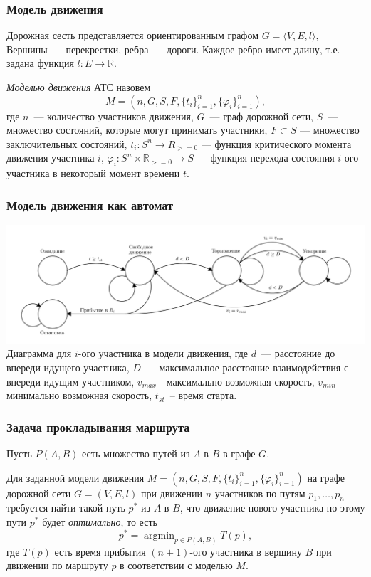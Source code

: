 \documentclass{beamer}
\DeclareMathOperator*{\argmin}{argmin}
\begin{document}
\begin{frame}\frametitle{Модель движения}
Дорожная сесть представляется ориентированным графом $ G = \langle V, E, l\rangle$, Вершины~--- перекрестки, ребра~--- дороги. Каждое ребро имеет длину, т.е. задана функция $l : E \rightarrow \mathbb {R} $.

  \textit{Моделью движения} АТС назовем $$M = \left(n, G, S, F, \{t_i\}_{i = 1}^n, \{\varphi_i\}_{i = 1}^n \right),$$ где $n$~--- количество участников движения, $G$~--- граф дорожной сети, $S$~--- множество состояний, которые могут принимать участники, $F \subset S$ --- множество заключительных состояний, $t_i: S^n \rightarrow R_{>=0}$ --- функция критического момента движения участника $i$, $\varphi_i: S^n \times \mathbb{R}_{>= 0} \rightarrow S$ --- функция перехода состояния $i$-ого участника в некоторый момент времени $t$.

\end{frame}


\begin{frame}\frametitle{Модель движения как автомат}
  \includegraphics[width=\textwidth]{example-gen.png}
  Диаграмма для $i$-ого участника в модели движения, где $d$~--- расстояние до впереди идущего участника, $D$~--- максимальное расстояние взаимодействия с впереди идущим участником, $v_{max}$~--максимально возможная скорость, $v_{min}$~--минимально возможная скорость, $t_{st}$~-- время старта.
\end{frame}


\begin{frame}\frametitle{Задача прокладывания маршрута}
  Пусть $P(A,B)$ есть множество путей из $A$ в $B$ в графе $G$.

  Для заданной модели движения $M = \left(n, G, S, F, \{t_i\}_{i = 1}^n, \{\varphi_i\}_{i = 1}^n \right)$ на графе дорожной сети $G=(V, E, l)$ при движении $n$ участников по путям $p_1, \dots, p_n$ требуется найти такой путь $p^*$ из $A$ в $B$, что движение нового участника по этому пути $p^*$ будет \textit{оптимально}, то есть
$$p^* = \argmin_{p \in P(A, B)} T(p),$$
где $T(p)$ есть время прибытия $(n+1)$-ого участника в вершину $B$ при движении по маршруту $p$ в соответствии с моделью $M$.
\end{frame}
\end{document}
